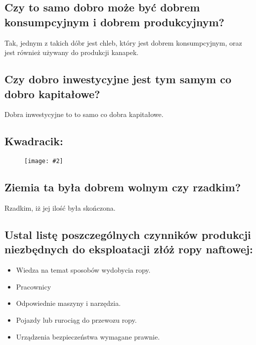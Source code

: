 \documentclass[a4paper,12pt]{article}
\newcommand{\obrazek}[2]{
	\begin{figure}[h]
		\centering
		\texttt{[image: \#2]}
	\end{figure}
}
\begin{document}
\subsection{Czy to samo dobro może być dobrem konsumpcyjnym i dobrem produkcyjnym?}

Tak, jednym z takich dóbr jest chleb, który jest dobrem konsumpcyjnym, oraz jest również używany do produkcji kanapek. 

\subsection{Czy dobro inwestycyjne jest tym samym co dobro kapitałowe?}

Dobra inwestycyjne to to samo co dobra kapitałowe.

\subsection{Kwadracik:}

\obrazek{0.5}{kwadrat.png}

\subsection{}
\subsection{}
\subsection{}
\subsection{Ziemia ta była dobrem wolnym czy rzadkim?}

Rzadkim, iż jej ilość była skończona.

\subsection{Ustal listę poszczególnych czynników produkcji niezbędnych do eksploatacji złóż ropy naftowej:}
\begin{itemize}
	\item Wiedza na temat sposobów wydobycia ropy.
	\item Pracownicy
	\item Odpowiednie maszyny i narzędzia.
	\item Pojazdy lub rurociąg do przewozu ropy.
	\item Urządzenia bezpieczeństwa wymagane prawnie.
\end{itemize}
\end{document}
